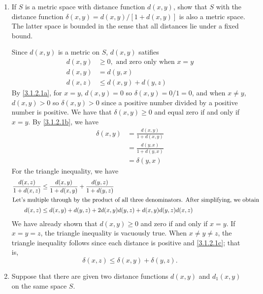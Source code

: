 \begin{enumerate}[ref = \theenumi{}]
\item
  \label{3.1.2.1}
  If \(S\) is a metric space with distance function \(d(x,y)\), show that \(S\)
  with the distance function \(\delta(x,y) = d(x,y)/[1 + d(x,y)]\) is also a
  metric space.
  The latter space is bounded in the sense that all distances lie under a fixed
  bound.
  \par\smallskip
  Since \(d(x,y)\) is a metric on \(S\), \(d(x,y)\) satifies
  \begin{subequations}
    \begin{align}
      d(x, y) & \geq 0,\text{  and zero only when \(x = y\)}\label{3.1.2.1a}\\
      d(x, y) & = d(y, x)\label{3.1.2.1b}\\
      d(x, z) & \leq d(x, y) + d(y, z)\label{3.1.2.1c}
    \end{align}
  \end{subequations}
  By \cref{3.1.2.1a}, for \(x = y\), \(d(x,y) = 0\) so
  \(\delta(x,y) = 0/1 = 0\), and when \(x\neq y\), \(d(x,y) > 0\) so
  \(\delta(x,y) > 0\) since a positive number divided by a positive number is
  positive.
  We have that \(\delta(x,y)\geq 0\) and equal zero if and only if \(x = y\).
  By \cref{3.1.2.1b}, we have
  \begin{align*}
    \delta(x, y) & = \frac{d(x, y)}{1 + d(x, y)}\\
                 & = \frac{d(y, x)}{1 + d(y, x)}\\
                 & = \delta(y, x)
  \end{align*}
  For the triangle inequality, we have
  \begin{align*}
    \frac{d(x, z)}{1 + d(x, z)}
    & \leq \frac{d(x, y)}{1 + d(x, y)} + \frac{d(y, z)}{1 + d(y, z)}\\
    \intertext{Let's multiple through by the product of all three
    denominators.
    After simplifying, we obtain}
    d(x, z) & \leq d(x, y) + d(y,z) + 2d(x, y)d(y, z) + d(x, y)d(y, z)d(x, z)
  \end{align*}
  We have already shown that \(d(x,y)\geq 0\) and zero if and only if
  \(x = y\).
  If \(x = y = z\), the triangle inequality is vacuously true.
  When \(x\neq y\neq z\), the triangle inequality follows since each distance
  is positive and \cref{3.1.2.1c}; that is,
  \[
  \delta(x, z)\leq \delta(x, y) + \delta(y, z).
  \]
\item
  Suppose that there are given two distance functions \(d(x,y)\) and
  \(d_1(x,y)\) on the same space \(S\).

\end{enumerate}
